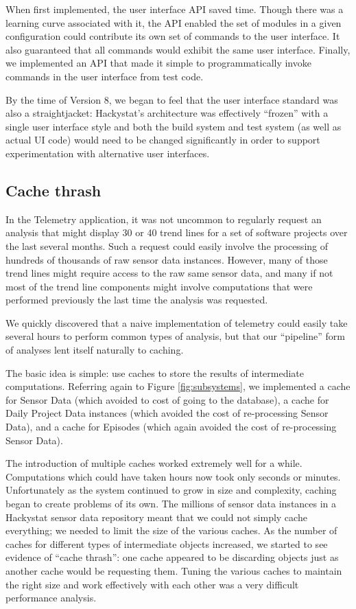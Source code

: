 \documentclass[conference,compsoc]{IEEEtran}
\begin{document}
When first implemented, the user interface API saved time.  Though there
was a learning curve associated with it, the API enabled the set of modules
in a given configuration could contribute its own set of commands to the
user interface.  It also guaranteed that all commands would exhibit the
same user interface. Finally, we implemented an API that made it simple to
programmatically invoke commands in the user interface from test code.

By the time of Version 8, we began to feel that the user interface standard
was also a straightjacket: Hackystat's architecture was effectively
``frozen'' with a single user interface style and both the build system and
test system (as well as actual UI code) would need to be changed
significantly in order to support experimentation with alternative user
interfaces.

\subsection{Cache thrash}
\label{sec:caching}

In the Telemetry application, it was not uncommon to regularly request an
analysis that might display 30 or 40 trend lines for a set of software
projects over the last several months. Such a request could easily involve
the processing of hundreds of thousands of raw sensor data
instances. However, many of those trend lines might require access to the
raw same sensor data, and many if not most of the trend line components
might involve computations that were performed previously the last time the
analysis was requested.

We quickly discovered that a naive implementation of telemetry could
easily take several hours to perform common types of analysis, but that our 
``pipeline'' form of analyses lent itself naturally to caching.

The basic idea is simple: use caches to store the results of intermediate
computations.  Referring again to Figure \ref{fig:subsystems}, we
implemented a cache for Sensor Data (which avoided to cost of going to the
database), a cache for Daily Project Data instances (which avoided the cost
of re-processing Sensor Data), and a cache for Episodes (which again
avoided the cost of re-processing Sensor Data).

The introduction of multiple caches worked extremely well for a while.
Computations which could have taken hours now took only seconds or minutes.
Unfortunately as the system continued to grow in size and complexity,
caching began to create problems of its own.  The millions of sensor data
instances in a Hackystat sensor data repository meant that we could not
simply cache everything; we needed to limit the size of the various caches.
As the number of caches for different types of intermediate objects
increased, we started to see evidence of ``cache thrash'': one cache
appeared to be discarding objects just as another cache would be requesting
them. Tuning the various caches to maintain the right size and work
effectively with each other was a very difficult performance analysis.
\end{document}

